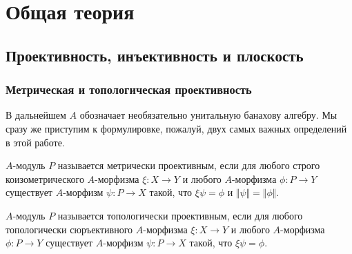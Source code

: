 
\chapter{Общая теория} %

\label{ChapterGeneralTheory} %


\section{Проективность, инъективность и плоскость}
\label{SectionProjectivityInjectivityAndFlatness}



\subsection{Метрическая и топологическая проективность}
\label{SubSectionMetricAndTopologicalProjectivity}

В дальнейшем $A$ обозначает необязательно унитальную банахову алгебру. Мы сразу же приступим к формулировке, пожалуй, двух самых важных определений в этой работе.

\begin{definition}\label{MetProjMod} $A$-модуль $P$ называется метрически проективным, если для любого строго коизометрического $A$-морфизма $\xi:X\to Y$ и любого $A$-морфизма $\phi:P\to Y$ существует $A$-морфизм $\psi:P\to X$ такой, что $\xi\psi=\phi$ и $\Vert\psi\Vert=\Vert\phi\Vert$.
\end{definition}

\begin{definition}\label{TopProjMod} $A$-модуль $P$ называется топологически проективным, если для любого топологически сюръективного $A$-морфизма $\xi:X\to Y$ и любого $A$-морфизма $\phi:P\to Y$ существует $A$-морфизм $\psi:P\to X$ такой, что $\xi\psi=\phi$.
\end{definition}

